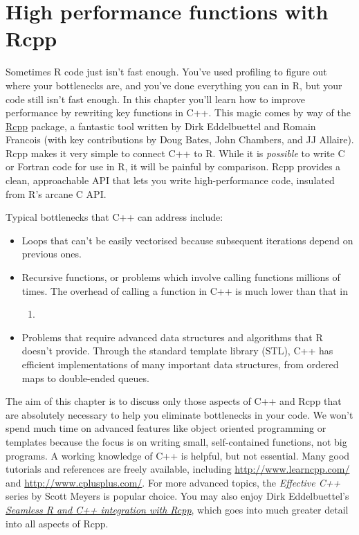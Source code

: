 \hypertarget{rcpp}{%
\chapter{High performance functions with Rcpp}\label{rcpp}}

Sometimes R code just isn't fast enough. You've used profiling to figure
out where your bottlenecks are, and you've done everything you can in R,
but your code still isn't fast enough. In this chapter you'll learn how
to improve performance by rewriting key functions in C++. This magic
comes by way of the \href{http://www.rcpp.org/}{Rcpp} package, a
fantastic tool written by Dirk Eddelbuettel and Romain Francois (with
key contributions by Doug Bates, John Chambers, and JJ Allaire). Rcpp
makes it very simple to connect C++ to R. While it is \emph{possible} to
write C or Fortran code for use in R, it will be painful by comparison.
Rcpp provides a clean, approachable API that lets you write
high-performance code, insulated from R's arcane C API. 

Typical bottlenecks that C++ can address include:

\begin{itemize}
\item
  Loops that can't be easily vectorised because subsequent iterations
  depend on previous ones.
\item
  Recursive functions, or problems which involve calling functions
  millions of times. The overhead of calling a function in C++ is much
  lower than that in

  \begin{enumerate}
  \def\labelenumi{\Alph{enumi}.}
  \setcounter{enumi}{17}
  \item
  \end{enumerate}
\item
  Problems that require advanced data structures and algorithms that R
  doesn't provide. Through the standard template library (STL), C++ has
  efficient implementations of many important data structures, from
  ordered maps to double-ended queues.
\end{itemize}

The aim of this chapter is to discuss only those aspects of C++ and Rcpp
that are absolutely necessary to help you eliminate bottlenecks in your
code. We won't spend much time on advanced features like object oriented
programming or templates because the focus is on writing small,
self-contained functions, not big programs. A working knowledge of C++
is helpful, but not essential. Many good tutorials and references are
freely available, including \url{http://www.learncpp.com/} and
\url{http://www.cplusplus.com/}. For more advanced topics, the
\emph{Effective C++} series by Scott Meyers is popular choice. You may
also enjoy Dirk Eddelbuettel's
\href{http://www.springer.com/statistics/computational+statistics/book/978-1-4614-6867-7}{\emph{Seamless
R and C++ integration with Rcpp}}, which goes into much greater detail
into all aspects of Rcpp.

